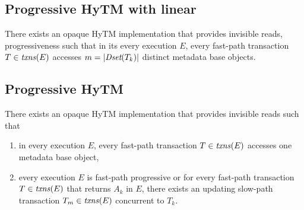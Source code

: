 \subsection{Progressive HyTM with linear}
%

%
\begin{theorem}
\label{th:inswrite}
There exists an opaque HyTM implementation that provides invisible reads, progressiveness
such that
in its every execution $E$, every fast-path transaction $T\in \ms{txns}(E)$
accesses $m=|\textit{Dset}(T_k)|$ distinct metadata base objects.
\end{theorem}
\subsection{Progressive HyTM}
%
\begin{theorem}
\label{th:inswrite2}
There exists an opaque HyTM implementation that provides invisible reads
such that 
\begin{enumerate}
 \item 
in every execution $E$,
every fast-path transaction $T\in \ms{txns}(E)$
accesses one metadata base object,
\item
every execution $E$ is fast-path progressive or for
every fast-path transaction $T\in \ms{txns}(E)$
that returns $A_k$ in $E$, there exists an updating slow-path transaction $T_m \in \ms{txns}(E)$
concurrent to $T_k$.
\end{enumerate}
\end{theorem}



%